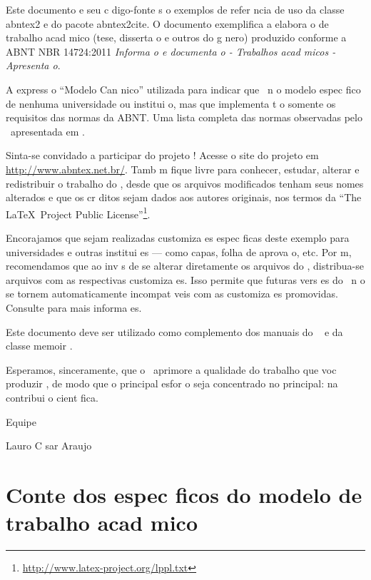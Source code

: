 \documentclass{article}
\begin{document}
Este documento e seu c digo-fonte s o exemplos de refer ncia de uso da classe
\textsf{abntex2} e do pacote \textsf{abntex2cite}. O documento 
exemplifica a elabora o de trabalho acad mico (tese, disserta o e outros do
g nero) produzido conforme a ABNT NBR 14724:2011 \emph{Informa o e documenta o
- Trabalhos acad micos - Apresenta o}.

A express o ``Modelo Can nico''   utilizada para indicar que \abnTeX\ n o  
modelo espec fico de nenhuma universidade ou institui o, mas que implementa t o
somente os requisitos das normas da ABNT. Uma lista completa das normas
observadas pelo \abnTeX\   apresentada em \cite{abntex2classe}.

Sinta-se convidado a participar do projeto \abnTeX! Acesse o site do projeto em
\url{http://www.abntex.net.br/}. Tamb m fique livre para conhecer,
estudar, alterar e redistribuir o trabalho do \abnTeX, desde que os arquivos
modificados tenham seus nomes alterados e que os cr ditos sejam dados aos
autores originais, nos termos da ``The \LaTeX\ Project Public
License''\footnote{\url{http://www.latex-project.org/lppl.txt}}.

Encorajamos que sejam realizadas customiza es espec ficas deste exemplo para
universidades e outras institui es --- como capas, folha de aprova o, etc.
Por m, recomendamos que ao inv s de se alterar diretamente os arquivos do
\abnTeX, distribua-se arquivos com as respectivas customiza es.
Isso permite que futuras vers es do \abnTeX~n o se tornem automaticamente
incompat veis com as customiza es promovidas. Consulte
\cite{abntex2-wiki-como-customizar} para mais informa es.

Este documento deve ser utilizado como complemento dos manuais do \abnTeX\ 
\cite{abntex2classe,abntex2cite,abntex2cite-alf} e da classe \textsf{memoir}
\cite{memoir}. 

Esperamos, sinceramente, que o \abnTeX\ aprimore a qualidade do trabalho que
voc  produzir , de modo que o principal esfor o seja concentrado no principal:
na contribui o cient fica.

Equipe \abnTeX 

Lauro C sar Araujo



\chapter{Conte dos espec ficos do modelo de trabalho acad mico}\label{cap_trabalho_academico}
\end{document}
